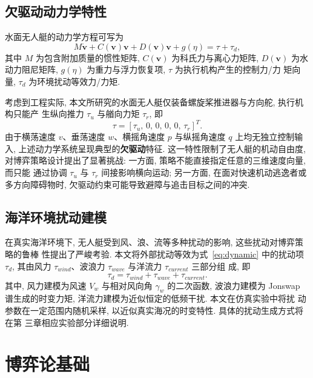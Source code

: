 \subsection{欠驱动动力学特性}
\label{subsec:underactuated}
水面无人艇的动力学方程可写为
\begin{equation}
M\dot{\bm{v}} + C(\bm{v})\bm{v} + D(\bm{v})\bm{v} + g(\eta) = \tau + \tau_d,
\label{eq:dynamic}
\end{equation}
其中 $M$ 为包含附加质量的惯性矩阵, $C(\bm{v})$ 为科氏力与离心力矩阵, $D(\bm{v})$
为水动力阻尼矩阵, $g(\eta)$ 为重力与浮力恢复项, $\tau$ 为执行机构产生的控制力/力
矩向量, $\tau_d$ 为环境扰动等效力/力矩.

考虑到工程实际, 本文所研究的水面无人艇仅装备螺旋桨推进器与方向舵, 执行机构只能产
生纵向推力 $\tau_u$ 与艏向力矩 $\tau_r$, 即
\begin{equation}
\tau = [\tau_u,\, 0,\, 0,\, 0,\, 0,\, \tau_r]^T.
\label{eq:underactuated_tau}
\end{equation}
由于横荡速度 $v$、垂荡速度 $w$、横摇角速度 $p$ 与纵摇角速度 $q$ 上均无独立控制输
入, 上述动力学系统呈现典型的\textbf{欠驱动}特征. 这一特性限制了无人艇的机动自由度,
对博弈策略设计提出了显著挑战: 一方面, 策略不能直接指定任意的三维速度向量, 而只能
通过协调 $\tau_u$ 与 $\tau_r$ 间接影响横向运动; 另一方面, 在面对快速机动逃逸者或
多方向障碍物时, 欠驱动约束可能导致避障与追击目标之间的冲突.

\subsection{海洋环境扰动建模}
\label{subsec:disturbance}
在真实海洋环境下, 无人艇受到风、浪、流等多种扰动的影响, 这些扰动对博弈策略的鲁棒
性提出了严峻考验. 本文将外部扰动等效为式~\eqref{eq:dynamic} 中的扰动项 $\tau_d$,
其由风力 $\tau_{wind}$、波浪力 $\tau_{wave}$ 与洋流力 $\tau_{current}$ 三部分组
成, 即
\begin{equation}
\tau_d = \tau_{wind} + \tau_{wave} + \tau_{current}.
\label{eq:tau_d}
\end{equation}
其中, 风力建模为风速 $V_w$ 与相对风向角 $\gamma_w$ 的二次函数, 波浪力建模为
Jonswap 谱生成的时变力矩, 洋流力建模为近似恒定的低频干扰. 本文在仿真实验中将扰
动参数在一定范围内随机采样, 以近似真实海况的时变特性. 具体的扰动生成方式将在第
三章相应实验部分详细说明.

\section{博弈论基础}
\label{sec:game_theory}

